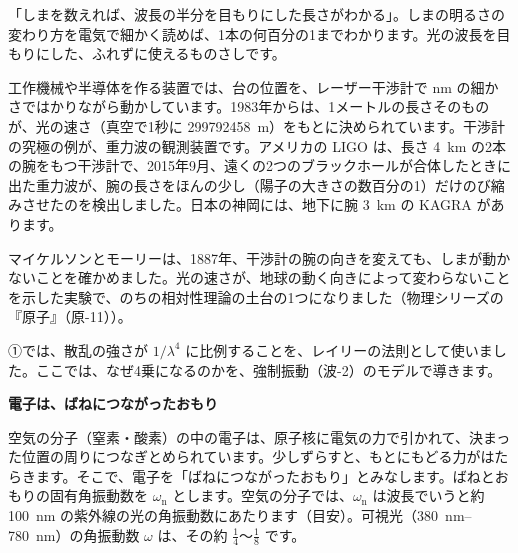 \begin{phyomi}[$\Delta=M\lambda/2$]
「しまを数えれば、波長の半分を目もりにした長さがわかる」。しまの明るさの変わり方を電気で細かく読めば、1本の何百分の1までわかります。光の波長を目もりにした、ふれずに使えるものさしです。
\end{phyomi}

\begin{phmijika}
工作機械や半導体を作る装置では、台の位置を、レーザー干渉計で \unit{nm} の細かさではかりながら動かしています。1983年からは、1メートルの長さそのものが、光の速さ（真空で1秒に \qty{299792458}{m}）をもとに決められています。干渉計の究極の例が、重力波の観測装置です。アメリカの LIGO は、長さ \qty{4}{km} の2本の腕をもつ干渉計で、2015年9月、遠くの2つのブラックホールが合体したときに出た重力波が、腕の長さをほんの少し（陽子の大きさの数百分の1）だけのび縮みさせたのを検出しました。日本の神岡には、地下に腕 \qty{3}{km} の KAGRA があります。
\end{phmijika}

\begin{seikaku}
マイケルソンとモーリーは、1887年、干渉計の腕の向きを変えても、しまが動かないことを確かめました。光の速さが、地球の動く向きによって変わらないことを示した実験で、のちの相対性理論の土台の1つになりました（物理シリーズの『原子』（原-11））。
\end{seikaku}


\leavevmode\label{ph:波-13:sec8}①では、散乱の強さが $1/\lambda^4$ に比例することを、レイリーの法則として使いました。ここでは、なぜ4乗になるのかを、強制振動（波-2）のモデルで導きます。

\noindent\textbf{電子は、ばねにつながったおもり}\par\nobreak
空気の分子（窒素・酸素）の中の電子は、原子核に電気の力で引かれて、決まった位置の周りにつなぎとめられています。少しずらすと、もとにもどる力がはたらきます。そこで、電子を「ばねにつながったおもり」とみなします。ばねとおもりの固有角振動数を $\omega_{\mathrm n}$ とします。空気の分子では、$\omega_{\mathrm n}$ は波長でいうと約 \qty{100}{nm} の紫外線の光の角振動数にあたります（目安）。可視光（\qtyrange{380}{780}{nm}）の角振動数 $\omega$ は、その約 $\tfrac14$〜$\tfrac18$ です。

